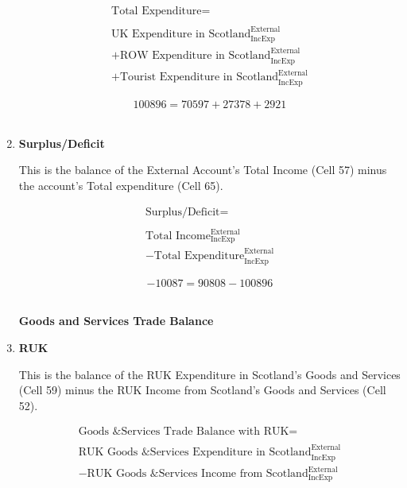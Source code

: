 \begin{enumerate}
\begin{equation}
\begin{split}
\text{Total Expenditure} =  \\ \\
\text{UK Expenditure in Scotland}^\text{External}_\text{IncExp}\\
+\text{ROW Expenditure in Scotland}^\text{External}_\text{IncExp}\\
+\text{Tourist Expenditure in Scotland}^\text{External}_\text{IncExp}
\end{split} \label{eq:2.5.69}
\end{equation}

\begin{equation} \nonumber
100896 = 70597+27378+2921
\end{equation}\\


\item \textbf {Surplus/Deficit}

This is the balance of the External Account's Total Income (Cell 57) minus the account's Total expenditure (Cell 65).

\begin{equation}
\begin{split}
\text{Surplus/Deficit} =  \\ \\
\text{Total Income}^\text{External}_\text{IncExp}\\
-\text{Total Expenditure}^\text{External}_\text{IncExp}
\end{split} \label{eq:2.5.70}
\end{equation}

\begin{equation} \nonumber
-10087 = 90808-100896
\end{equation}\\

\newpage

\begin{center}
\textbf{\LARGE Goods and Services Trade Balance}
\end{center}

\item \textbf {RUK}

This is the balance of the RUK Expenditure in Scotland's Goods and Services (Cell 59) minus the RUK Income from Scotland's Goods and Services (Cell 52).

\begin{equation}
\begin{split}
\text{Goods \& Services Trade Balance with RUK} =  \\ \\
\text{RUK Goods \& Services Expenditure in Scotland}^\text{External}_\text{IncExp}\\
-\text{RUK Goods \& Services Income from Scotland}^\text{External}_\text{IncExp}
\end{split} \label{eq:2.5.71}
\end{equation}


\end{enumerate}
